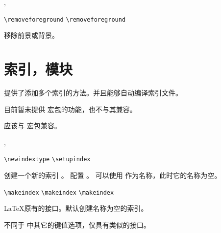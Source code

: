 \documentclass[twoside]{book}
\def\xampletext{\par}
\def\xampleprint{\xamplecode \xampleline \xampletext}
\begin{document}

\begin{function}{\removeforeground,\removebackground}
  \begin{syntax}
    \verb|\removeforeground|
    \verb|\removeforeground| 
  \end{syntax}
移除前景或背景。
\end{function}


\section{索引，模块}

\CusTeX 提供了添加多个索引的方法。并且能够自动编译索引文件。

目前暂未提供  宏包的功能，也不与其兼容。

应该与  宏包兼容。

\begin{function}{\newindextype,\setupindex}
  \begin{syntax}
    \verb|\newindextype|  
    \verb|\setupindex|    
  \end{syntax}
 创建一个新的索引 。
 配置 。
 可以使用  作为名称，此时它的名称为空。
\end{function}

\begin{function}{\makeindex}
  \begin{syntax}
    \verb|\makeindex|
    \verb|\makeindex| 
    \verb|\makeindex|  
  \end{syntax}
\LaTeX 原有的接口。默认创建名称为空的索引。
\end{function}

 不同于 \CusTeX 中其它的键值选项，仅具有类似的接口。
\end{document}
